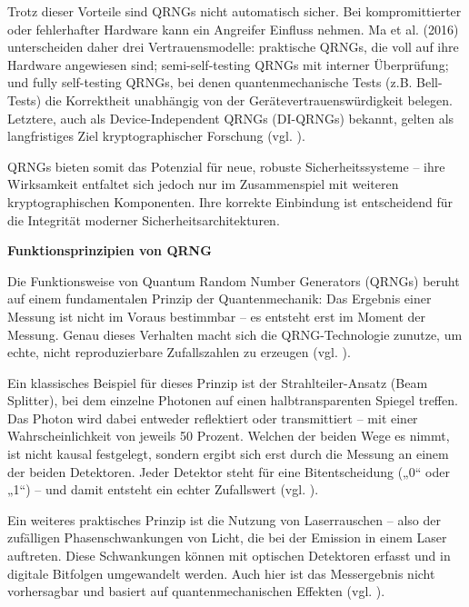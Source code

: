 Trotz dieser Vorteile sind QRNGs nicht automatisch sicher. Bei kompromittierter oder fehlerhafter Hardware kann ein Angreifer Einfluss nehmen. Ma et al. (2016) unterscheiden daher drei Vertrauensmodelle: praktische QRNGs, die voll auf ihre Hardware angewiesen sind; semi-self-testing QRNGs mit interner Überprüfung; und fully self-testing QRNGs, bei denen quantenmechanische Tests (z.B. Bell-Tests) die Korrektheit unabhängig von der Gerätevertrauenswürdigkeit belegen. Letztere, auch als Device-Independent QRNGs (DI-QRNGs) bekannt, gelten als langfristiges Ziel kryptographischer Forschung (vgl. \cite{ma_x_et_al_quantum_2016}).


QRNGs bieten somit das Potenzial für neue, robuste Sicherheitssysteme – ihre Wirksamkeit entfaltet sich jedoch nur im Zusammenspiel mit weiteren kryptographischen Komponenten. Ihre korrekte Einbindung ist entscheidend für die Integrität moderner Sicherheitsarchitekturen.


\vspace{1em}
\textbf{Funktionsprinzipien von QRNG}


Die Funktionsweise von Quantum Random Number Generators (QRNGs) beruht auf einem fundamentalen Prinzip der Quantenmechanik: Das Ergebnis einer Messung ist nicht im Voraus bestimmbar – es entsteht erst im Moment der Messung. Genau dieses Verhalten macht sich die QRNG-Technologie zunutze, um echte, nicht reproduzierbare Zufallszahlen zu erzeugen (vgl. \cite{herrero-collantes_et_al_quantum_2017}).


Ein klassisches Beispiel für dieses Prinzip ist der Strahlteiler-Ansatz (Beam Splitter), bei dem einzelne Photonen auf einen halbtransparenten Spiegel treffen. Das Photon wird dabei entweder reflektiert oder transmittiert – mit einer Wahrscheinlichkeit von jeweils 50 Prozent. Welchen der beiden Wege es nimmt, ist nicht kausal festgelegt, sondern ergibt sich erst durch die Messung an einem der beiden Detektoren. Jeder Detektor steht für eine Bitentscheidung („0“ oder „1“) – und damit entsteht ein echter Zufallswert (vgl. \cite{jennewein_t_et_al_fast_2000}).


Ein weiteres praktisches Prinzip ist die Nutzung von Laserrauschen – also der zufälligen Phasenschwankungen von Licht, die bei der Emission in einem Laser auftreten. Diese Schwankungen können mit optischen Detektoren erfasst und in digitale Bitfolgen umgewandelt werden. Auch hier ist das Messergebnis nicht vorhersagbar und basiert auf quantenmechanischen Effekten (vgl. \cite{ma_x_et_al_quantum_2016}).


